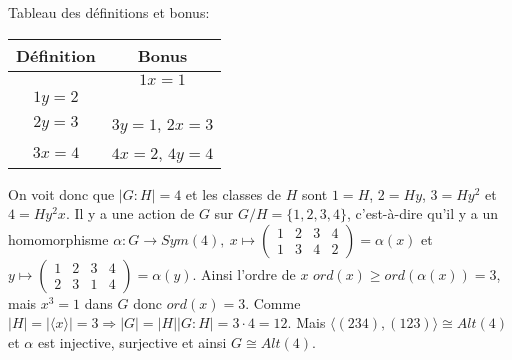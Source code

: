 \begin{ex}
      
       Tableau des définitions et bonus:
       \begin{center}
         \begin{tabular}{|c|c|}
           \hline
           Définition & Bonus\\
           \hline
               & $1x = 1$\\
           $1y = 2$ & \\
           $2y = 3$ & $3y = 1$, $2x = 3$\\
           $3x = 4$ & $4x = 2$, $4y = 4$\\
           \hline
         \end{tabular}
       \end{center}

       On voit donc que $|G:H| = 4$ et les classes de $H$ sont $1 = H$, $2 = Hy$, $3 = Hy^2$ et $4 =
       Hy^2x$. Il y a une action de $G$ sur $G/H = \{1,2,3,4\}$, c'est-à-dire qu'il y a un homomorphisme
       $\alpha : G \to Sym(4),\ x \mapsto
       \begin{pmatrix}
         1 & 2 & 3 & 4\\
         1 & 3 & 4 & 2
       \end{pmatrix} = \alpha(x)$ et $y \mapsto
       \begin{pmatrix}
         1 & 2 & 3 & 4 \\
         2 & 3 & 1 & 4
       \end{pmatrix} = \alpha(y)$. Ainsi l'ordre de $x$ $ord(x) \geq ord(\alpha(x)) = 3$, mais $x^3 = 1$ dans
       $G$ donc $ord(x) = 3$. Comme $|H| = |\langle x \rangle| = 3 \Rightarrow |G| = |H||G:H| = 3 \cdot 4 =
       12$. Mais $\langle (234), (123)\rangle \cong Alt(4)$ et $\alpha$ est injective, surjective et ainsi $G
       \cong Alt(4)$.
     \end{ex}


